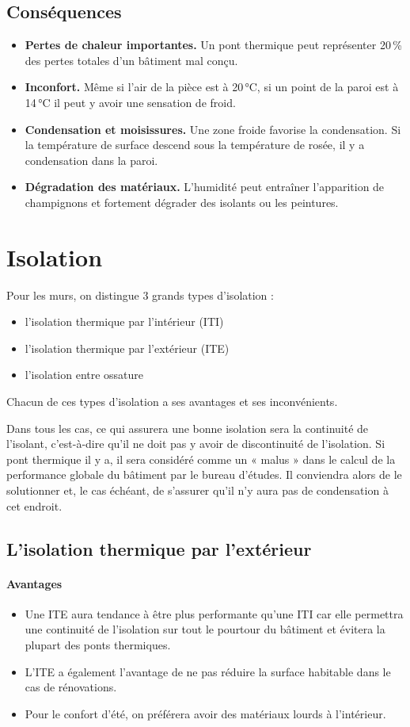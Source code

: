 \subsection*{Conséquences}
\begin{itemize}
  \item \textbf{Pertes de chaleur importantes.} Un pont thermique peut représenter 20\,\% des pertes totales d'un bâtiment mal conçu.
  \item \textbf{Inconfort.} Même si l'air de la pièce est à 20\,°C, si un point de la paroi est à 14\,°C il peut y avoir une sensation de froid.
  \item \textbf{Condensation et moisissures.} Une zone froide favorise la condensation. Si la température de surface descend sous la température de rosée, il y a condensation dans la paroi.
  \item \textbf{Dégradation des matériaux.} L'humidité peut entraîner l'apparition de champignons et fortement dégrader des isolants ou les peintures.
\end{itemize}

\section{Isolation}

Pour les murs, on distingue 3 grands types d'isolation :
\begin{itemize}
  \item l'isolation thermique par l'intérieur (ITI)
  \item l'isolation thermique par l'extérieur (ITE)
  \item l'isolation entre ossature
\end{itemize}
Chacun de ces types d'isolation a ses avantages et ses inconvénients.

Dans tous les cas, ce qui assurera une bonne isolation sera la continuité de l'isolant, c'est-à-dire qu'il ne doit pas y avoir de discontinuité de l'isolation.
Si pont thermique il y a, il sera considéré comme un « malus » dans le calcul de la performance globale du bâtiment par le bureau d'études.
Il conviendra alors de le solutionner et, le cas échéant, de s'assurer qu'il n'y aura pas de condensation à cet endroit.

\subsection*{L'isolation thermique par l'extérieur}
\paragraph{Avantages}
\begin{itemize}
  \item Une ITE aura tendance à être plus performante qu'une ITI car elle permettra une continuité de l'isolation sur tout le pourtour du bâtiment et évitera la plupart des ponts thermiques.
  \item L'ITE a également l'avantage de ne pas réduire la surface habitable dans le cas de rénovations.
  \item Pour le confort d'été, on préférera avoir des matériaux lourds à l'intérieur.
\end{itemize}

